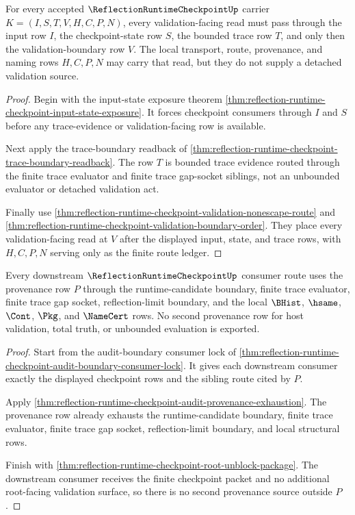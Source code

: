\begin{theorem}
\label{thm:reflection-runtime-checkpoint-validation-trace-scope-row}
For every accepted $\ReflectionRuntimeCheckpointUp$ carrier $K=(I,S,T,V,H,C,P,N)$, every validation-facing read must pass through the input row $I$, the checkpoint-state row $S$, the bounded trace row $T$, and only then the validation-boundary row $V$. The local transport, route, provenance, and naming rows $H,C,P,N$ may carry that read, but they do not supply a detached validation source.
\end{theorem}
\begin{proof}
Begin with the input-state exposure theorem \autoref{thm:reflection-runtime-checkpoint-input-state-exposure}. It forces checkpoint consumers through $I$ and $S$ before any trace-evidence or validation-facing row is available.

Next apply the trace-boundary readback of \autoref{thm:reflection-runtime-checkpoint-trace-boundary-readback}. The row $T$ is bounded trace evidence routed through the finite trace evaluator and finite trace gap-socket siblings, not an unbounded evaluator or detached validation act.

Finally use \autoref{thm:reflection-runtime-checkpoint-validation-nonescape-route} and \autoref{thm:reflection-runtime-checkpoint-validation-boundary-order}. They place every validation-facing read at $V$ after the displayed input, state, and trace rows, with $H,C,P,N$ serving only as the finite route ledger.
\end{proof}

\begin{theorem}
\label{thm:reflection-runtime-checkpoint-provenance-consumer-row}
Every downstream $\ReflectionRuntimeCheckpointUp$ consumer route uses the provenance row $P$ through the runtime-candidate boundary, finite trace evaluator, finite trace gap socket, reflection-limit boundary, and the local $\BHist$, $\hsame$, $\Cont$, $\Pkg$, and $\NameCert$ rows. No second provenance row for host validation, total truth, or unbounded evaluation is exported.
\end{theorem}
\begin{proof}
Start from the audit-boundary consumer lock of \autoref{thm:reflection-runtime-checkpoint-audit-boundary-consumer-lock}. It gives each downstream consumer exactly the displayed checkpoint rows and the sibling route cited by $P$.

Apply \autoref{thm:reflection-runtime-checkpoint-audit-provenance-exhaustion}. The provenance row already exhausts the runtime-candidate boundary, finite trace evaluator, finite trace gap socket, reflection-limit boundary, and local structural rows.

Finish with \autoref{thm:reflection-runtime-checkpoint-root-unblock-package}. The downstream consumer receives the finite checkpoint packet and no additional root-facing validation surface, so there is no second provenance source outside $P$.
\end{proof}

